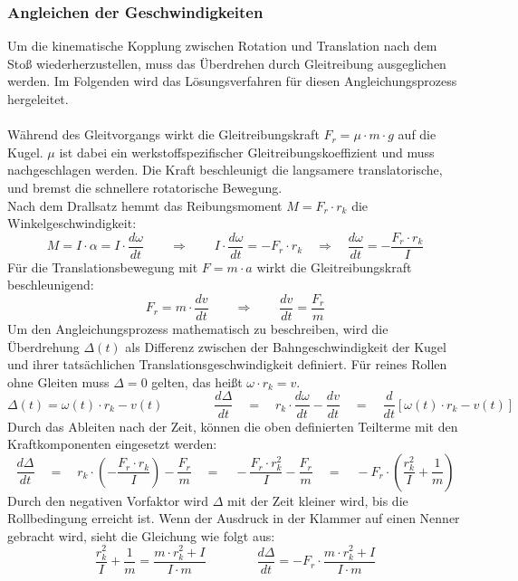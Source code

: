 \subsubsection{Angleichen der Geschwindigkeiten}
Um die kinematische Kopplung zwischen Rotation und Translation nach dem Stoß wiederherzustellen, muss das Überdrehen durch Gleitreibung ausgeglichen werden. Im Folgenden wird das Lösungsverfahren für diesen Angleichungsprozess hergeleitet.
\\
\\
Während des Gleitvorgangs wirkt die Gleitreibungskraft $F_r = \mu \cdot m \cdot g$ \parencite{tipler_reibung} auf die Kugel. $\mu$ ist dabei ein werkstoffspezifischer Gleitreibungskoeffizient und muss nachgeschlagen werden. Die Kraft beschleunigt die langsamere translatorische, und bremst die schnellere rotatorische Bewegung.
\\
Nach dem Drallsatz hemmt das Reibungsmoment $M = F_r \cdot r_k$ die Winkelgeschwindigkeit\parencite{boege_drall}:
\[
M = I \cdot \alpha = I \cdot \frac{d\omega}{dt} \qquad \Longrightarrow \qquad I \cdot \frac{d\omega}{dt} = -F_r \cdot r_k \quad \Rightarrow \quad \frac{d\omega}{dt} = -\frac{F_r \cdot r_k}{I}
\]
Für die Translationsbewegung mit $F = m \cdot a$ wirkt die Gleitreibungskraft beschleunigend:
\[
F_r = m \cdot \frac{dv}{dt} \qquad \Longrightarrow \qquad \frac{dv}{dt} = \frac{F_r}{m}
\]
Um den Angleichungsprozess mathematisch zu beschreiben, wird die Überdrehung $\Delta(t)$ als Differenz zwischen der Bahngeschwindigkeit der Kugel und ihrer tatsächlichen Translationsgeschwindigkeit definiert. Für reines Rollen ohne Gleiten muss $\Delta = 0$ gelten, das heißt $\omega \cdot r_k = v$.
\[
\Delta(t) = \omega(t) \cdot r_k - v(t) \qquad \qquad \frac{d\Delta}{dt} \quad = \quad r_k \cdot \frac{d\omega}{dt} - \frac{dv}{dt} \quad = \quad \frac{d}{dt}\left[\omega(t) \cdot r_k - v(t)\right]
\]
Durch das Ableiten nach der Zeit, können die oben definierten Teilterme mit den Kraftkomponenten eingesetzt werden:
\[
\frac{d\Delta}{dt} \quad = \quad r_k \cdot \left(-\frac{F_r \cdot r_k}{I}\right) - \frac{F_r}{m} \quad = \quad -\frac{F_r \cdot r_k^2}{I} - \frac{F_r}{m} \quad = \quad -F_r \cdot \left(\frac{r_k^2}{I} + \frac{1}{m}\right)
\]
Durch den negativen Vorfaktor wird $\Delta$ mit der Zeit kleiner wird, bis die Rollbedingung erreicht ist. Wenn der Ausdruck in der Klammer auf einen Nenner gebracht wird, sieht die Gleichung wie folgt aus: 
\[
\frac{r_k^2}{I} + \frac{1}{m} = \frac{m \cdot r_k^2 + I}{I \cdot m} \qquad \qquad \frac{d\Delta}{dt} = -F_r \cdot \frac{m \cdot r_k^2 + I}{I \cdot m}
\]
